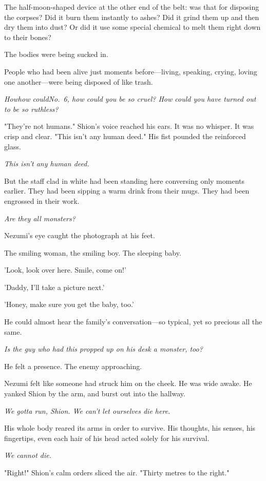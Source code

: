The half-moon-shaped device at the other end of the belt: was that for
disposing the corpses? Did it burn them instantly to ashes? Did it grind
them up and then dry them into dust? Or did it use some special chemical
to melt them right down to their bones?

The bodies were being sucked in.

People who had been alive just moments before---living, speaking, crying,
loving one another---were being disposed of like trash.

\emph{How\el how could\el No.~6, how could you be so cruel? How could you have
turned out to be so ruthless?}

"They're not humans." Shion's voice reached his ears. It was no whisper.
It was crisp and clear. "This isn't any human deed." His fist pounded
the reinforced glass.

\emph{This isn't any human deed.}

But the staff clad in white had been standing here conversing only
moments earlier. They had been sipping a warm drink from their mugs.
They had been engrossed in their work.

\emph{Are they all monsters?}

Nezumi's eye caught the photograph at his feet.

The smiling woman, the smiling boy. The sleeping baby.

'Look, look over here. Smile, come on!'

'Daddy, I'll take a picture next.'

'Honey, make sure you get the baby, too.'

He could almost hear the family's conversation---so typical, yet so
precious all the same.

\emph{Is the guy who had this propped up on his desk a monster, too?}

He felt a presence. The enemy approaching.

Nezumi felt like someone had struck him on the cheek. He was wide awake.
He yanked Shion by the arm, and burst out into the hallway.

\emph{We gotta run, Shion. We can't let ourselves die here.}

His whole body reared its arms in order to survive. His thoughts, his
senses, his fingertips, even each hair of his head acted solely for his
survival.

\emph{We cannot die.}

"Right!" Shion's calm orders sliced the air. "Thirty metres to the
right."

